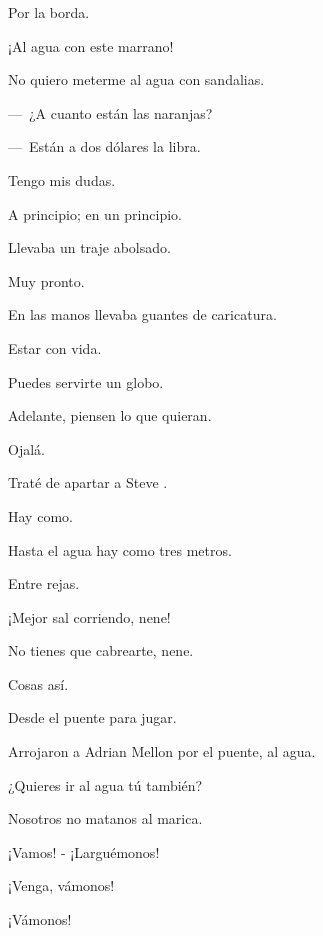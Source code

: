 \sk
Por la borda. 

\sk
¡Al agua con este marrano! 

\sk
No quiero meterme al agua con sandalias. 

\sk
---~¿A cuanto están las naranjas? 

---~Están a dos dólares la libra. 

\sk
Tengo mis dudas. 

\sk
A principio; en un principio. 

\sk
Llevaba un traje abolsado. \nb{}

\sk
Muy pronto. 

\sk
En las manos llevaba guantes de caricatura. 

\sk
Estar con vida. 

\sk
Puedes servirte un globo. 

\sk
Adelante, piensen lo que quieran. 

\sk
Ojalá. 

\sk
Traté de apartar a Steve . 

\sk
Hay como. 

\sk
Hasta el agua hay como tres metros. 

\sk
Entre rejas. 

\sk
¡Mejor sal corriendo, nene! 

\sk
No tienes que cabrearte, nene. 

\sk
Cosas así. 

\sk
Desde el puente para jugar. 

\sk
Arrojaron a Adrian Mellon por el puente, al agua.\nb{}

\sk
¿Quieres ir al agua tú también?\nb{}

\sk
Nosotros no matanos al marica. 

\sk
¡Vamos! - ¡Larguémonos! 

\sk
¡Venga, vámonos! 

\sk
¡Vámonos!

